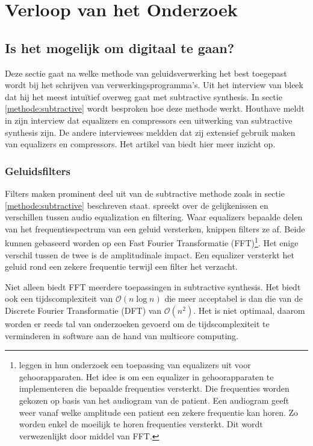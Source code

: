 \chapter{Verloop van het Onderzoek}
\label{ch:onderzoek}

\section{Is het mogelijk om digitaal te gaan?}
\label{onderzoeksvraag1}

Deze sectie gaat na welke methode van geluidsverwerking het best toegepast wordt bij het schrijven van verwerkingsprogramma's. Uit het interview van \textcite{thomashouthave} bleek dat hij het meest intuïtief overweg gaat met subtractive synthesis. In sectie \ref{methode:subtractive} wordt besproken hoe deze methode werkt. Houthave meldt in zijn interview dat equalizers en compressors een uitwerking van subtractive synthesis zijn. \autocite{thomashouthave} De andere interviewees meldden dat zij extensief gebruik maken van equalizers en compressors. Het artikel van \textcite{filtervseq} biedt hier meer inzicht op.

\subsection{Geluidsfilters}

Filters maken prominent deel uit van de subtractive methode zoals in sectie \ref{methode:subtractive} beschreven staat. \textcite{filtervseq} spreekt over de gelijkenissen en verschillen tussen audio equalization en filtering. Waar equalizers bepaalde delen van het frequentiespectrum van een geluid versterken, knippen filters ze af. Beide kunnen gebaseerd worden op een Fast Fourier Transformatie (FFT)\footnote{\textcite{fouriereq} leggen in hun onderzoek een toepassing van equalizers uit voor gehoorapparaten. Het idee is om een equalizer in gehoorapparaten te implementeren die bepaalde frequenties versterkt. Die frequenties worden gekozen op basis van het audiogram van de patient. Een audiogram geeft weer vanaf welke amplitude een patient een zekere frequentie kan horen. Zo worden enkel de moeilijk te horen frequenties versterkt. Dit wordt verwezenlijkt door middel van FFT.}. Het enige verschil tussen de twee is de amplitudinale impact. Een equalizer versterkt het geluid rond een zekere frequentie terwijl een filter het verzacht.

Niet alleen biedt FFT meerdere toepassingen in subtractive synthesis. Het biedt ook een tijdscomplexiteit van $\mathcal{O}(n\log{}n)$ die meer acceptabel is dan die van de Discrete Fourier Transformatie (DFT) van $\mathcal{O}(n^2)$.\autocite{ffttime} Het is niet optimaal, daarom worden er reeds tal van onderzoeken gevoerd om de tijdscomplexiteit te verminderen in software aan de hand van multicore computing. \autocite{robbievincke}

